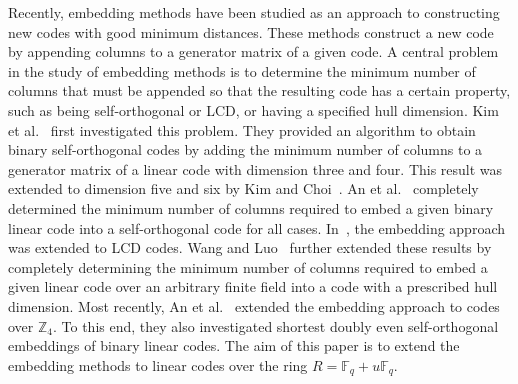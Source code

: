 \documentclass{article}
\theoremstyle{definition}
\theoremstyle{remark}
\begin{document}
Recently, embedding methods have been studied as an approach to constructing new codes with good minimum distances. These methods construct a new code by appending columns to a generator matrix of a given code. A central problem in the study of embedding methods is to determine the minimum number of columns that must be appended so that the resulting code has a certain property, such as being self-orthogonal or LCD, or having a specified hull dimension. Kim et al.~\cite{KKL-2021} first investigated this problem. They provided an algorithm to obtain binary self-orthogonal codes by adding the minimum number of columns to a generator matrix of a linear code with dimension three and four. This result was extended to dimension five and six by Kim and Choi~\cite{KC-2022}. An et al.~\cite{AKKLW-arXiv1} completely determined the minimum number of columns required to embed a given binary linear code into a self-orthogonal code for all cases. In~\cite{A-2026}, the embedding approach was extended to LCD codes. Wang and Luo~\cite{WL-2026} further extended these results by completely determining the minimum number of columns required to embed a given linear code over an arbitrary finite field into a code with a prescribed hull dimension. Most recently, An et al.~\cite{AKS-arXiv} extended the embedding approach to codes over $\mathbb Z_4$. To this end, they also investigated shortest doubly even self-orthogonal embeddings of binary linear codes. The aim of this paper is to extend the embedding methods to linear codes over the ring $R=\mathbb F_q+u\mathbb F_q$.
\end{document}

